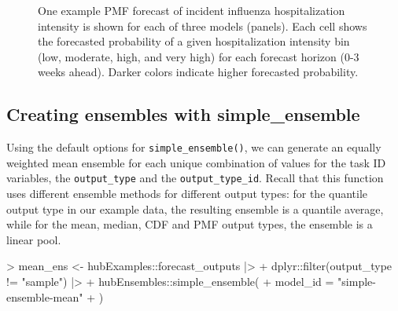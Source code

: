 \documentclass[
  letterpaper,
  DIV=11,
  numbers=noendperiod]{scrartcl}
\newenvironment{Shaded}{\begin{snugshade}}{\end{snugshade}}
\newcommand{\AttributeTok}[1]{\textcolor[rgb]{0.40,0.45,0.13}{#1}}
\newcommand{\FunctionTok}[1]{\textcolor[rgb]{0.28,0.35,0.67}{#1}}
\newcommand{\NormalTok}[1]{\textcolor[rgb]{0.00,0.23,0.31}{#1}}
\newcommand{\OtherTok}[1]{\textcolor[rgb]{0.00,0.23,0.31}{#1}}
\newcommand{\SpecialCharTok}[1]{\textcolor[rgb]{0.37,0.37,0.37}{#1}}
\newcommand{\StringTok}[1]{\textcolor[rgb]{0.13,0.47,0.30}{#1}}
\begin{document}
\begin{figure}


\caption{\label{fig-plot-ex-mods-pmf}One example PMF forecast of
incident influenza hospitalization intensity is shown for each of three
models (panels). Each cell shows the forecasted probability of a given
hospitalization intensity bin (low, moderate, high, and very high) for
each forecast horizon (0-3 weeks ahead). Darker colors indicate higher
forecasted probability.}

\end{figure}%

\subsection{Creating ensembles with
simple\_ensemble}\label{creating-ensembles-with-simple_ensemble}

Using the default options for \texttt{simple\_ensemble()}, we can
generate an equally weighted mean ensemble for each unique combination
of values for the task ID variables, the \texttt{output\_type} and the
\texttt{output\_type\_id}. Recall that this function uses different
ensemble methods for different output types: for the quantile output
type in our example data, the resulting ensemble is a quantile average,
while for the mean, median, CDF and PMF output types, the ensemble is a
linear pool.

\begin{Shaded}
\begin{Highlighting}[]
\SpecialCharTok{\textgreater{}}\NormalTok{ mean\_ens }\OtherTok{\textless{}{-}}\NormalTok{ hubExamples}\SpecialCharTok{::}\NormalTok{forecast\_outputs }\SpecialCharTok{|\textgreater{}}
\SpecialCharTok{+}\NormalTok{   dplyr}\SpecialCharTok{::}\FunctionTok{filter}\NormalTok{(output\_type }\SpecialCharTok{!=} \StringTok{"sample"}\NormalTok{) }\SpecialCharTok{|\textgreater{}}
\SpecialCharTok{+}\NormalTok{   hubEnsembles}\SpecialCharTok{::}\FunctionTok{simple\_ensemble}\NormalTok{(}
\SpecialCharTok{+}     \AttributeTok{model\_id =} \StringTok{"simple{-}ensemble{-}mean"}
\SpecialCharTok{+}\NormalTok{   )}
\end{Highlighting}
\end{Shaded}
\end{document}

